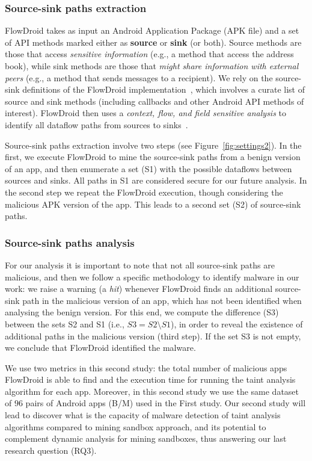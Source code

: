 \subsubsection{Source-sink paths extraction}

FlowDroid takes as input an Android Application Package (APK file) and
a set of API methods marked either as {\bf source}
or {\bf sink} (or both). Source methods are those that access \emph{sensitive information} (e.g.,
a method that access the address book), while sink methods are those 
that \emph{might share information with external peers} (e.g., a method that
sends messages to a recipient). We rely on the source-sink definitions
of the FlowDroid implementation~\cite{arzt:pldi-2014,rasthofer-source-sink},
which involves a curate list of source and sink methods (including callbacks and
other Android API methods of interest).
FlowDroid then uses a \emph{context, flow, and field
sensitive analysis} to identify all dataflow paths from sources to sinks~\cite{arzt:pldi-2014}.

Source-sink paths extraction involve two steps (see Figure~\ref{fig:settings2}). In the first, we execute FlowDroid to mine the source-sink paths from a benign version of an app, and then enumerate a set (S1) with the 
possible dataflows between sources and sinks. All paths in S1 are considered secure for
our future analysis. In the second step we repeat the FlowDroid execution, though
considering the malicious APK version of the app.
This leads to a second set (S2) of source-sink paths.

\subsubsection{Source-sink paths analysis}

For our analysis it is important to note that not all source-sink paths are malicious, and then we
follow a specific methodology to identify malware in our work: we raise a warning (a \emph{hit}) whenever
FlowDroid finds an additional source-sink path in the malicious version of an app, which
has not been identified when analysing the benign version. For this end, we compute the difference (S3) between the sets S2 and S1 (i.e., $S3 = S2 \setminus S1$), in order to reveal the existence of additional paths in the malicious version (third step). If the set S3 is not empty, we conclude that FlowDroid
identified the malware.

We use two metrics in this second study:
the total number of malicious apps FlowDroid is able to find and the execution time for running the taint analysis algorithm for each app. Moreover, in this second study we use the same dataset of $96$ pairs of Android apps (B/M) used in the First study. Our second study will lead to discover what is the capacity of malware detection of taint analysis algorithms compared to mining sandbox approach, and its potential to complement dynamic analysis for mining sandboxes, thus answering our last research question (RQ3).


